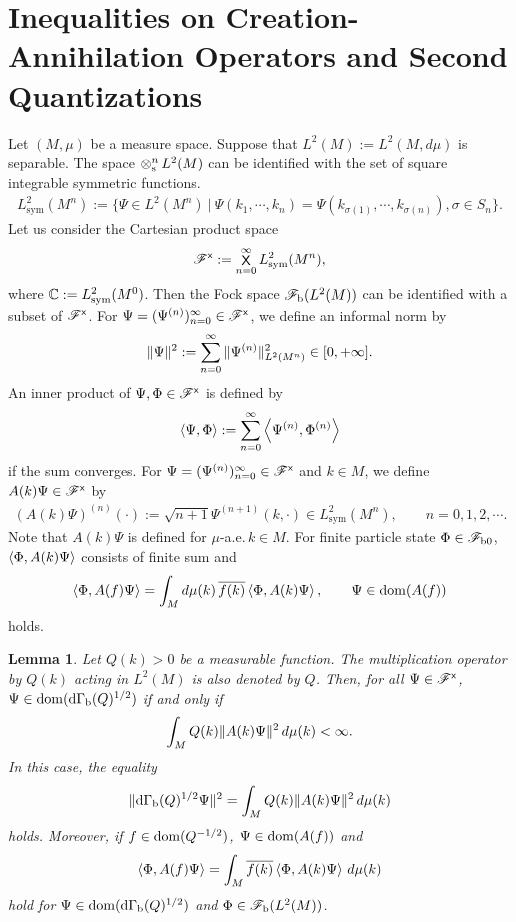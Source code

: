 \documentclass[12pt]{article}
\theoremstyle{plain}
\newtheorem{lem}[theorem]{\bf Lemma}
\numberwithin{equation}{section}
\theoremstyle{remark}
\begin{document}
\section{Inequalities on Creation-Annihilation Operators and Second Quantizations}
Let $(M,\mu)$ be a measure space. 
Suppose that $L^2(M):=L^2(M,d\mu)$ is separable.
The space $\mathop{\otimes}_\mathrm{s}^nL^2(M)$ can be identified with the set of square integrable symmetric functions.
\begin{align*}
L^2_\mathrm{sym}(M^n)
:= \big\{\Psi \in L^2(M^n) ~\big|~ \Psi(k_1,\cdots,k_n)=\Psi(k_{\sigma(1)},\cdots,k_{\sigma(n)}), \sigma\in S_n\big\}.
\end{align*}
Let us consider the Cartesian product space
\begin{align*}
  \mathscr{F}^\mathsf{x} := \mathop{\mathsf{X}}_{n=0}^\infty L^2_\mathrm{sym}(M^n),
\end{align*}
where $\mathbb{C}:=L^2_\mathrm{sym}(M^0)$.
Then the Fock space $\mathscr{F}_\mathrm{b}(L^2(M))$ can be identified with a subset of $\mathscr{F}^\mathsf{x}$.
For $\Psi=(\Psi^{(n)})_{n=0}^\infty \in \mathscr{F}^\mathsf{x}$, we define an informal norm by
\begin{align*}
  \| \Psi \|^2 := \sum_{n=0}^\infty \| \Psi^{(n)} \|_{L^2(M^n)}^2 \in [0,+\infty].
\end{align*}
An inner product of $\Psi,\Phi \in \mathscr{F}^\mathsf{x}$ is defined by
\begin{align*}
  \left\langle\Psi,\Phi\right\rangle := \sum_{n=0}^\infty \left\langle\Psi^{(n)},\Phi^{(n)}\right\rangle
\end{align*}
if the sum converges.
For $\Psi = (\Psi^{(n)})_{n=0}^\infty \in \mathscr{F}^\mathsf{x}$ and $k\in M$, we define
$A(k)\Psi \in \mathscr{F}^\mathsf{x}$ by
\begin{align}
 (A(k)\Psi)^{(n)}(\cdot) := \sqrt{n+1}\Psi^{(n+1)}(k,\cdot) \in L^2_\mathrm{sym}(M^n),
 \qquad n=0,1,2,\cdots.  \label{defAk}
\end{align}
Note that $A(k)\Psi$ is defined for $\mu$-a.e.\,$k\in M$.
For finite particle state $\Phi \in \mathscr{F}_{\mathrm{b}0}$, $\left\langle\Phi,A(k)\Psi\right\rangle$ consists of 
finite sum and 
\begin{align*}
  \left\langle\Phi,A(f)\Psi\right\rangle = \int_Md\mu(k)\,\overline{f(k)}\left\langle\Phi,A(k)\Psi\right\rangle,
 \qquad \Psi\in\mathop{\mathrm{dom}}(A(f))
\end{align*}
holds.
\begin{lem}{\label{ak1}}
 Let $Q(k)>0$ be a measurable function. 
The multiplication operator by $Q(k)$ acting in $L^2(M)$ is also denoted by $Q$.
Then, for all $\Psi\in\mathscr{F}^\mathsf{x}$, 
$\Psi\in\mathop{\mathrm{dom}}(\mathrm{d\Gamma_b}(Q)^{1/2})$ if and only if
\begin{align*}
  \int_M Q(k)\| A(k)\Psi \|^2 \,d\mu(k) < \infty.
\end{align*}
In this case, the equality
\begin{align*}
  \| \mathrm{d\Gamma_b}(Q)^{1/2}\Psi \|^2 = \int_M Q(k)\| A(k)\Psi \|^2 \,d\mu(k) 
\end{align*}
holds. Moreover, if $f\in\mathop{\mathrm{dom}}(Q^{-1/2})$, $\Psi\in\mathop{\mathrm{dom}}(A(f))$ and 
\begin{align*}
  \left\langle\Phi,A(f)\Psi\right\rangle = \int_M \overline{f(k)}\left\langle\Phi,A(k)\Psi\right\rangle \,d\mu(k)
\end{align*}
hold for $\Psi\in\mathop{\mathrm{dom}}(\mathrm{d\Gamma_b}(Q)^{1/2})$ and $\Phi\in\mathscr{F}_\mathrm{b}(L^2(M))$.
\end{lem}
\end{document}
